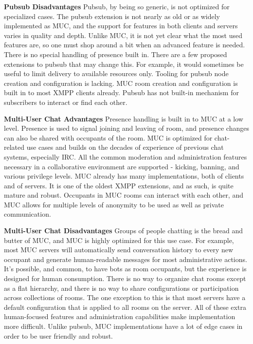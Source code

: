 	\textbf{Pubsub Disadvantages}
	\newline
	Pubsub, by being so generic, is not optimized for specialized cases. The pubsub extension is not nearly as old or as widely implemented as MUC, and the support for features in both clients and servers varies in quality and depth. Unlike MUC, it is not yet clear what the most used features are, so one must shop around a bit when an advanced feature is needed. There is no special handling of presence built in. There are a few proposed extensions to pubsub that may change this. For example, it would sometimes be useful to limit delivery to available resources only. Tooling for pubsub node creation and configuration is lacking. MUC room creation and configuration is built in to most XMPP clients already. Pubsub has not built-in mechanism for subscribers to interact or find each other. 

	\textbf{Multi-User Chat Advantages}
	\newline
	Presence handling is built in to MUC at a low level. Presence is used to signal joining and leaving of room, and presence changes can also be shared with occupants of the room. MUC is optimized for chat-related use cases and builds on the decades of experience of previous chat systems, especially IRC. All the common moderation and administration features necessary in a collaborative environment are supported - kicking, banning, and various privilege levels. MUC already has many implementations, both of clients and of servers. It is one of the oldest XMPP extensions, and as such, is quite mature and robust. Occupants in MUC rooms can interact with each other, and MUC allows for multiple levels of anonymity to be used as well as private communication.

	\textbf{Multi-User Chat Disadvantages}
	\newline
	Groups of people chatting is the bread and butter of MUC, and MUC is highly optimized for this use case. For example, most MUC servers will automatically send conversation history to every new occupant and generate human-readable messages for most administrative actions. It's possible, and common, to have bots as room occupants, but the experience is designed for human consumption. There is no way to organize chat rooms except as a flat hierarchy, and there is no way to share configurations or participation across collections of rooms. The one exception to this is that most servers have a default configuration that is applied to all rooms on the server. All of these extra human-focused features and administration capabilities make implementation more difficult. Unlike pubsub, MUC implementations have a lot of edge cases in order to be user friendly and robust.


